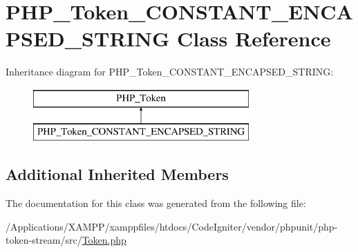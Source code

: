 \hypertarget{class_p_h_p___token___c_o_n_s_t_a_n_t___e_n_c_a_p_s_e_d___s_t_r_i_n_g}{}\section{P\+H\+P\+\_\+\+Token\+\_\+\+C\+O\+N\+S\+T\+A\+N\+T\+\_\+\+E\+N\+C\+A\+P\+S\+E\+D\+\_\+\+S\+T\+R\+I\+NG Class Reference}
\label{class_p_h_p___token___c_o_n_s_t_a_n_t___e_n_c_a_p_s_e_d___s_t_r_i_n_g}
Inheritance diagram for P\+H\+P\+\_\+\+Token\+\_\+\+C\+O\+N\+S\+T\+A\+N\+T\+\_\+\+E\+N\+C\+A\+P\+S\+E\+D\+\_\+\+S\+T\+R\+I\+NG\+:\begin{figure}[H]
\begin{center}
\leavevmode
\includegraphics[height=2.000000cm]{class_p_h_p___token___c_o_n_s_t_a_n_t___e_n_c_a_p_s_e_d___s_t_r_i_n_g}
\end{center}
\end{figure}
\subsection*{Additional Inherited Members}


The documentation for this class was generated from the following file\+:\begin{DoxyCompactItemize}
\item 
/\+Applications/\+X\+A\+M\+P\+P/xamppfiles/htdocs/\+Code\+Igniter/vendor/phpunit/php-\/token-\/stream/src/\mbox{\hyperlink{_token_8php}{Token.\+php}}\end{DoxyCompactItemize}
